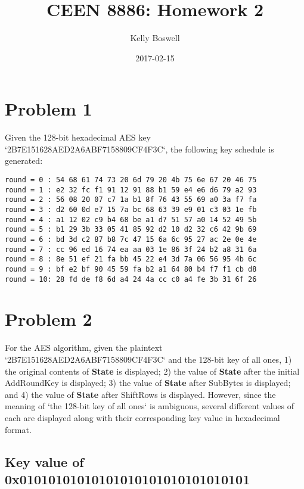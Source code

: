 \documentclass[a4paper]{report}
\title{CEEN 8886: Homework 2}
\date{2017-02-15}
\author{Kelly Boswell}
\begin{document}
\maketitle


\newpage


\section{Problem 1}

Given the 128-bit hexadecimal AES key `2B7E151628AED2A6ABF7158809CF4F3C`, the following key
schedule is generated:

\begin{verbatim}
round = 0 : 54 68 61 74 73 20 6d 79 20 4b 75 6e 67 20 46 75 
round = 1 : e2 32 fc f1 91 12 91 88 b1 59 e4 e6 d6 79 a2 93 
round = 2 : 56 08 20 07 c7 1a b1 8f 76 43 55 69 a0 3a f7 fa 
round = 3 : d2 60 0d e7 15 7a bc 68 63 39 e9 01 c3 03 1e fb 
round = 4 : a1 12 02 c9 b4 68 be a1 d7 51 57 a0 14 52 49 5b 
round = 5 : b1 29 3b 33 05 41 85 92 d2 10 d2 32 c6 42 9b 69 
round = 6 : bd 3d c2 87 b8 7c 47 15 6a 6c 95 27 ac 2e 0e 4e 
round = 7 : cc 96 ed 16 74 ea aa 03 1e 86 3f 24 b2 a8 31 6a 
round = 8 : 8e 51 ef 21 fa bb 45 22 e4 3d 7a 06 56 95 4b 6c 
round = 9 : bf e2 bf 90 45 59 fa b2 a1 64 80 b4 f7 f1 cb d8 
round = 10: 28 fd de f8 6d a4 24 4a cc c0 a4 fe 3b 31 6f 26 
\end{verbatim}

\section{Problem 2}

For the AES algorithm, given the plaintext `2B7E151628AED2A6ABF7158809CF4F3C` and the
128-bit key of all ones, 1) the original contents of \textbf{State} is displayed; 2) the
value of \textbf{State} after the initial AddRoundKey is displayed; 3) the value of \textbf{State}
after SubBytes is displayed; and 4) the value of \textbf{State} after ShiftRows is displayed. However,
since the meaning of `the 128-bit key of all ones` is ambiguous, several different
values of each are displayed along with their corresponding key value in hexadecimal format.

\subsection{Key value of 0x01010101010101010101010101010101} 
\end{document}
